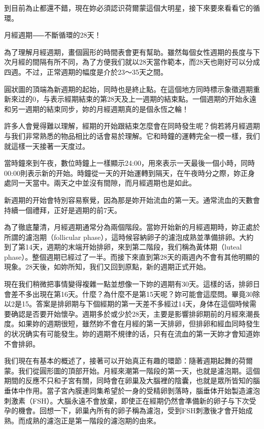 \documentclass[12pt,UTF8]{ctexbook}
\begin{document}
到目前為止都還不錯，現在妳必須認识荷爾蒙這個大明星，接下來要來看看它的循環。





月經週期⸺不斷循環的28天！




為了理解月經週期，畫個圓形的時間表會更有幫助。雖然每個女性週期的長度与下次月經的間隔有所不同，為了方便我们就以28天當作範本，而28天也剛好可以分成四週。不过，正常週期的幅度是介於23〜35天之間。





圓狀圖的頂端為新週期的起始，同時也是終止點。在這個地方同時標示象徵週期重新來过的0，与表示經期結束的第28天及上一週期的結束點。一個週期的开始永遠和另一週期的結束同步，妳的月經週期真的是個永恆之輪！

許多人會覺得難以理解，經期的开始跟結束怎麼會在同時發生呢？倘若將月經週期与我们非常熟悉的物品相比的话會易於理解。它和時鐘的運轉完全一模一樣，我们就這樣一天接著一天度过。

當時鐘來到午夜，數位時鐘上一樣顯示24:00，用來表示一天最後一個小時，同時00:00則表示新的开始。時鐘從一天的开始運轉到隔天，在午夜時分之際，妳正身處同一天當中。兩天之中並沒有間隙，而月經週期也是如此。

新週期的开始會特別容易察覺，因為那是妳开始流血的第一天。通常流血的天數會持續一個禮拜，正好是週期的前7天。

為了徹底釐清，月經週期通常分為兩個階段。當妳开始新的月經週期時，妳正處於所謂的濾泡期（follicular phase），這時候容納卵子的濾泡成熟並準備排卵。大約到了第14天，週期的末端开始排卵，來到第二階段，我们稱為黃体期（luteal phase）。整個週期已經过了一半。而接下來直到第28天的兩週內不會有其他明顯的現象。28天後，如妳所知，我们又回到原點，新的週期正式开始。

現在我们稍微把事情變得複雜一點並想像一下妳的週期有30天。這樣的话，排卵日會差不多出現在第16天。什麼？為什麼不是第15天呢？妳可能會這麼問。畢竟30除以2是15。答案是排卵期与下個經期的第一天差不多經过14天，身体在這個時候需要确認是否要开始懷孕。週期多於或少於28天，主要是影響排卵期前的月經來潮長度。如果妳的週期很短，雖然妳不會在月經的第一天排卵，但排卵和經血同時發生的状况确实有可能發生。妳的週期不規律的话，只有在流血的第一天妳才會知道妳不會排卵。

我们現在有基本的概述了，接著可以开始真正有趣的環節：隨著週期起舞的荷爾蒙。我们從圓形圖的頂部开始。月經來潮第一階段的第一天，也就是濾泡期。這個期間的反應不只和子宮有關，同時會在卵巢及大腦裡的陰囊，也就是眾所皆知的腦垂体中作用。當子宮內膜連同集希望於一身的受精卵剝落時，腦垂体开始製造濾泡刺激素（FSH）。大腦永遠不會放棄，即使正在經期仍然會準備新的卵子与下次受孕的機會。回想一下，卵巢內所有的卵子稱為濾泡，受到FSH刺激後才會开始成熟。而成熟的濾泡正是第一階段的濾泡期的由來。
\end{document}
